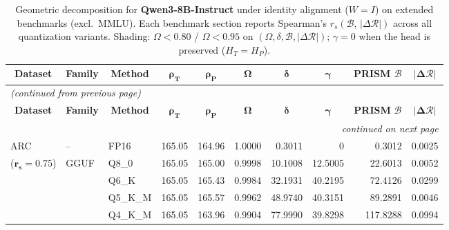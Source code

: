 \begingroup
\small
\setlength{\tabcolsep}{4pt}
\renewcommand{\arraystretch}{1.05}
\setlength{\LTcapwidth}{\textwidth}
\begin{longtable}{ll l rrrrrrr}
\caption{Geometric decomposition for \textbf{Qwen3-8B-Instruct} under identity alignment ($W{=}I$) on extended benchmarks (excl.\ MMLU). Each benchmark section reports Spearman's $r_s(\mathcal{B},\,|\Delta\mathcal{R}|)$ across all quantization variants. Shading: \colorbox{red!35}{$\Omega{<}0.80$} / \colorbox{red!18}{$\Omega{<}0.95$} on $(\Omega,\delta,\mathcal{B},|\Delta\mathcal{R}|)$; \colorbox{cyan!12}{$\gamma{=}0$} when the head is preserved ($H_T{=}H_P$).}\label{tab:qwen_instruct_decomposition_ext_bound}\\
\toprule
\multicolumn{1}{c}{\textbf{Dataset}} & \multicolumn{1}{c}{\textbf{Family}} & \multicolumn{1}{c}{\textbf{Method}} & \multicolumn{1}{c}{$\boldsymbol{\rho_T}$} & \multicolumn{1}{c}{$\boldsymbol{\rho_P}$} & \multicolumn{1}{c}{$\boldsymbol{\Omega}$} & \multicolumn{1}{c}{$\boldsymbol{\delta}$} & \multicolumn{1}{c}{$\boldsymbol{\gamma}$} & \multicolumn{1}{c}{\textbf{PRISM} $\boldsymbol{\mathcal{B}}$} & \multicolumn{1}{c}{$\boldsymbol{|\Delta\mathcal{R}|}$} \\
\midrule
\endfirsthead
\multicolumn{10}{l}{\small\itshape (continued from previous page)}\\
\toprule
\multicolumn{1}{c}{\textbf{Dataset}} & \multicolumn{1}{c}{\textbf{Family}} & \multicolumn{1}{c}{\textbf{Method}} & \multicolumn{1}{c}{$\boldsymbol{\rho_T}$} & \multicolumn{1}{c}{$\boldsymbol{\rho_P}$} & \multicolumn{1}{c}{$\boldsymbol{\Omega}$} & \multicolumn{1}{c}{$\boldsymbol{\delta}$} & \multicolumn{1}{c}{$\boldsymbol{\gamma}$} & \multicolumn{1}{c}{\textbf{PRISM} $\boldsymbol{\mathcal{B}}$} & \multicolumn{1}{c}{$\boldsymbol{|\Delta\mathcal{R}|}$} \\
\midrule
\endhead
\midrule
\multicolumn{10}{r}{\small\itshape continued on next page}\\
\endfoot
\bottomrule
\endlastfoot
ARC & -- & FP16 & 165.05 & 164.96 & 1.0000 & 0.3011 & \cellcolor{cyan!12} $0$ & 0.3012 & 0.0025 \\
{\small ($\mathbf{r_s{=}0.75}$)} & GGUF & Q8\_0 & 165.05 & 165.00 & 0.9998 & 10.1008 & 12.5005 & 22.6013 & 0.0052 \\
 &  & Q6\_K & 165.05 & 165.43 & 0.9984 & 32.1931 & 40.2195 & 72.4126 & 0.0299 \\
 &  & Q5\_K\_M & 165.05 & 165.57 & 0.9962 & 48.9740 & 40.3151 & 89.2891 & 0.0046 \\
 &  & Q4\_K\_M & 165.05 & 163.96 & 0.9904 & 77.9990 & 39.8298 & 117.8288 & 0.0994 \\

\end{longtable}
